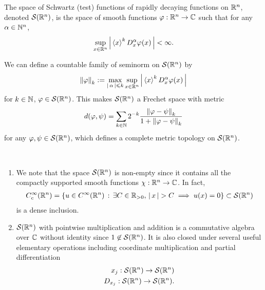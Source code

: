 \documentclass[12pt]{article}
\begin{document}
\begin{fdefinition}
    The space of Schwartz (test) functions of rapidly decaying functions on $\R^n$, denoted $\sch(\R^n)$, is the space of smooth functions $\varphi : \R^n \to \C$ such that for any $\alpha \in \N^n$, 
    \begin{align}
    \sup_{x \in \R^n} \abs{\sym[x]^k D^\alpha_x \varphi(x)} < \infty. 
    \end{align}

    
    We can define a countable family of seminorm on $\sch(\R^n)$ by 
    \begin{align}
    \norm[\varphi]_k := \max_{\abs{\alpha} \leq k} \sup_{x \in \R^n} \abs{\sym[x]^k D^\alpha_x \varphi(x)}
    \end{align}
    for $k \in \N$, $\varphi \in \sch(\R^n)$. This makes $\sch(\R^n)$ a Frechet space with metric 
    \begin{align*}
    d(\varphi, \psi) = \sum_{k \in \N} 2^{-k} \frac{\norm[\varphi - \psi]_k}{1 + \norm[\varphi - \psi]_k} 
    \end{align*}
    for any $\varphi, \psi \in \sch(\R^n)$, which defines a complete metric topology on $\sch(\R^n)$. 
\end{fdefinition}
\begin{rem} \hfill \\
    \begin{enumerate}
        \item     We note that the space $\sch(\R^n)$ is non-empty since it contains all the compactly supported smooth functions $\chi : \R^n \to \C$. In fact, 
        \begin{align*}
        C^\infty_c(\R^n) = \set{u \in C^\infty(\R^n) \wh \exists C \in \R_{> 0}, \, \abs{x} > C \implies u(x) = 0} \subset \sch(\R^n)
        \end{align*}
        is a dense inclusion. 
        
        \item $\sch(\R^n)$ with pointwise multiplication and addition is a commutative algebra over $\C$ without identity since $1 \not\in \sch(\R^n)$. It is also closed under several useful elementary operations including coordinate multiplication and partial differentiation
        \begin{align*}
        x_j : \sch(\R^n) \to \sch(\R^n) \\
        D_{x_j} : \sch(\R^n) \to \sch(\R^n). 
        \end{align*}
        
    \end{enumerate}
\end{rem}
\end{document}
